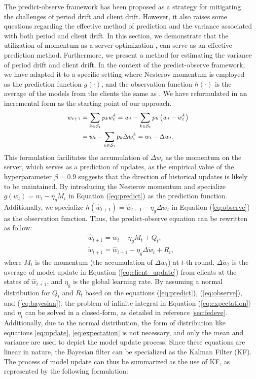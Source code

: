 The predict-observe framework has been proposed as a strategy for mitigating the challenges of period drift and client drift. However, it also raises some questions regarding the effective method of prediction and the variance associated with both period and client drift. In this section, we demonstrate that the utilization of momentum as a server optimization \citep{hsu2019measuring,reddi2020adaptive}, can serve as an effective prediction method. Furthermore, we present a method for estimating the variance of period drift and client drift. In the context of the predict-observe framework, we have adapted it to a specific setting where Nesterov momentum is employed as the prediction function $g(\cdot)$, and the observation function $h(\cdot)$ is the average of the models from the clients the same as \fedavg. We have reformulated \fedavg in an incremental form as the starting point of our approach.
\begin{equation}\label{eq:client_update}
   \small
   \begin{aligned}
      w_{t+1}&=\sum_{k \in \mathcal{S}_t}p_k w^k_t=w_t-\sum_{k \in \mathcal{S}_t}p_k \left(w_t-w^k_t\right)\\
      &=w_t-\sum_{k \in \mathcal{S}_t}p_k \Delta w^k_t=w_t-\Delta w_t.
   \end{aligned}
\end{equation}
This formulation facilitates the accumulation of $\Delta w_t$ as the momentum on the server, which serves as a prediction of updates, as the empirical value of the hyperparameter $\beta=0.9$ suggests that the direction of historical updates is likely to be maintained. By introducing the Nesterov momentum and specialize $g(w_t)=w_t-\eta_g M_t$ in Equation (\ref{eq:predict}) as the prediction function. Additionally, we specialize $h(\hat{w}_{t+1})=\hat{w}_{t+1}-\eta_g \Delta \tilde{w}_{t}$ in Equation (\ref{eq:observe}) as the observation function. Thus, the predict-observe equation can be rewritten as follow:
\begin{align}
   &\hat{w}_{t+1}=w_t-\eta_g M_t+Q_{t},\label{eq:spe_predict}\\
   &\tilde{w}_{t+1}=\hat{w}_{t+1}-\eta_g \Delta \tilde{w}_{t}+R_{t},\label{eq:spe_observe}
\end{align}
where $M_t$ is the momentum (the accumulation of $\Delta w_t$) at $t$-th round, $\Delta \tilde{w}_{t}$ is the average of model update in Equation (\ref{eq:client_update}) from clients at the states of $\hat{w}_{t+1}$, and $\eta_g$ is the global learning rate. By assuming a normal distribution for $Q_t$ and $R_t$ based on the equations (\ref{eq:predict}), (\ref{eq:observe}), and (\ref{eq:bayesian}), the problem of infinite integral in Equation (\ref{eq:expectation}) and $\eta_t$ can be solved in a closed-form, as detailed in reference \ref{sec:fedeve}. Additionally, due to the normal distribution, the form of distribution like equations \ref{eq:update}, \ref{eq:expectation} is not necessary, and only the mean and variance are used to depict the model update process. Since these equations are linear in nature, the Bayesian filter can be specialized as the Kalman Filter (KF). The process of model update can thus be summarized as the use of KF, as represented by the following formulation:
